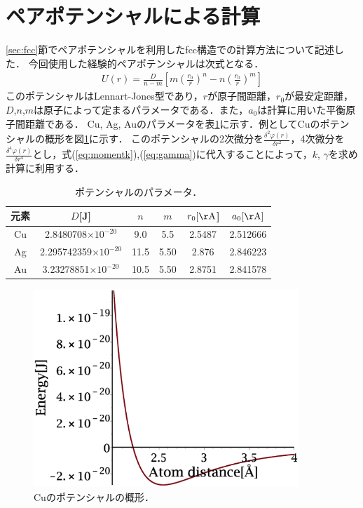 \section{ペアポテンシャルによる計算}
\ref{sec:fcc}節でペアポテンシャルを利用したfcc構造での計算方法について記述した．
今回使用した経験的ペアポテンシャルは次式となる．
\begin{eqnarray}
\label{eq:method1}
U(r)=\frac{D}{n-m}\left[m{\left(\frac{r_0}{r}\right)}^n-n{\left(\frac{r_0}{r}\right)}^m\right]
\end{eqnarray}
このポテンシャルはLennart-Jones型であり，$r$が原子間距離，$r_0$が最安定距離，$D$,$n$,$m$は原子によって定まるパラメータである．また，$a_0$は計算に用いた平衡原子間距離である．
Cu, Ag, Auのパラメータを表\ref{tb:potential}に示す．例としてCuのポテンシャルの概形を図\ref{fig:lj}に示す．
このポテンシャルの2次微分を$\frac{\delta^2 \varphi(r)}{\delta r^2}$，4次微分を$\frac{\delta^4 \varphi(r)}{\delta r^4}$とし，式(\ref{eq:momentk}),(\ref{eq:gamma})に代入することによって，$k$, $\gamma$を求め計算に利用する．
\begin{table}[htbp]
\caption{ポテンシャルのパラメータ．}
  \label{tb:potential}
  \centering
  \begin{tabular}{cccccc}\hline
    元素 & $D$[J] & $n$ & $m$ & $r_0[\mathrm{\AA}$] & $a_0[\mathrm{\AA}]$\\ \hline \hline
    Cu & 2.8480708$\times10^{-20}$ & 9.0 & 5.5 & 2.5487 & 2.512666\\
    Ag & 2.295742359$\times10^{-20}$ & 11.5 & 5.50 & 2.876 & 2.846223\\
    Au & 3.23278851$\times10^{-20}$ & 10.5 & 5.50 & 2.8751 & 2.841578\\ \hline
  \end{tabular}
\end{table}
\begin{figure}[htbp]
 \begin{center}
  \includegraphics[width=100mm]{../image/lj.eps}
 \end{center}
 \caption{Cuのポテンシャルの概形．}
 \label{fig:lj}
\end{figure}
